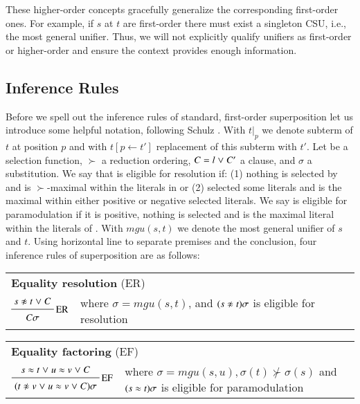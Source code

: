 These higher-order concepts gracefully generalize the corresponding first-order
ones. For example, if $s$ at $t$ are first-order there must exist a singleton
CSU, i.e., the most general unifier. Thus, we will not explicitly qualify
unifiers as first-order or higher-order and ensure the context provides enough
information.

\subsection{Inference Rules}
\newcommand{\mgu}{\ensuremath{\mathit{mgu}}}

Before we spell out the inference rules of standard, first-order superposition
let us introduce some helpful notation, following Schulz \cite{ss-02-brainiac}.
With $t|_p$ we denote subterm of $t$ at position $p$ and with $t[p \leftarrow
t']$ replacement of this subterm with $t'$. Let \selfun{} be a selection function,
$\succ$ a reduction ordering, $C = l \mathrel\lor C'$ a clause, and $\sigma$ a
substitution. We say that  is eligible for resolution if: (1) nothing
is selected by \selfun{} and  is $\succ$-maximal within the literals in
 or (2) \selfun{} selected some literals and  is the maximal
within either positive or negative selected literals. We say  is
eligible for paramodulation if it is positive, nothing is selected and
 is the maximal literal within the literals of . With
$\mgu(s,t)$ we denote the most general unifier of $s$ and $t$. Using horizontal
line to separate premises and the conclusion, four inference rules of
superposition are as follows:

\begin{tabular}{m{}m{}}
    \multicolumn{2}{l}{{\bf Equality resolution} (ER)} \\[\jot]
    $\namedinference{ER}{s \noteq t \llor C}{\sigmacl{C}}$ & where $\sigma = \mgu(s,t)$, and $(s \noteq t)\sigma$ is eligible for resolution
\end{tabular}

\medskip

\begin{tabular}{m{}m{}}
    \multicolumn{2}{l}{{\bf Equality factoring} (EF)} \\[\jot]
    $\namedinference{EF}{s \eq t \llor u \eq v \llor C}{\sigmacl{(t \noteq v \llor u \eq v \llor C)}}$ 
        & where $\sigma = \mgu(s,u), \sigma(t) \not\succ \sigma(s)$ and 
        $(s \approx t)\sigma$ is eligible for paramodulation
\end{tabular}


